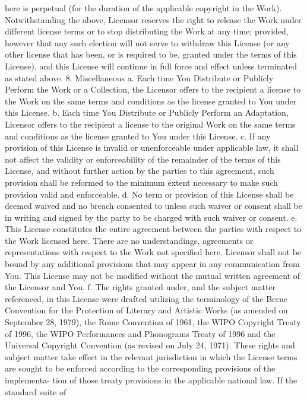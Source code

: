\documentclass[oneside]{book}
\begin{document}
here is perpetual (for the duration of the applicable copyright in the
Work). Notwithstanding the above, Licensor reserves the right to release the
Work under different license terms or to stop distributing the Work at any time;
provided, however that any such election will not serve to withdraw this License
(or any other license that has been, or is required to be, granted under the
terms of this License), and this License will continue in full force and effect
unless terminated as stated above.  8. Miscellaneous a. Each time You Distribute
or Publicly Perform the Work or a Collection, the Licensor offers to the
recipient a license to the Work on the same terms and conditions as the license
granted to You under this License.  b. Each time You Distribute or Publicly
Perform an Adaptation, Licensor offers to the recipient a license to the
original Work on the same terms and conditions as the license granted to You
under this License.  c. If any provision of this License is invalid or
unenforceable under applicable law, it shall not affect the validity or
enforceability of the remainder of the terms of this License, and without
further action by the parties to this agreement, such provision shall be
reformed to the minimum extent necessary to make such provision valid and
enforceable.  d. No term or provision of this License shall be deemed waived and
no breach consented to unless such waiver or consent shall be in writing and
signed by the party to be charged with such waiver or consent.  e. This License
constitutes the entire agreement between the parties with respect to the Work
licensed here. There are no understandings, agreements or representations with
respect to the Work not specified here. Licensor shall not be bound by any
additional provisions that may appear in any communication from You. This
License may not be modified without the mutual written agreement of the Licensor
and You.  f. The rights granted under, and the subject matter referenced, in
this License were drafted utilizing the terminology of the Berne Convention for
the Protection of Literary and Artistic Works (as amended on September 28,
1979), the Rome Convention of 1961, the WIPO Copyright Treaty of 1996, the WIPO
Performances and Phonograms Treaty of 1996 and the Universal Copyright
Convention (as revised on July 24, 1971). These rights and subject matter take
effect in the relevant jurisdiction in which the License terms are sought to be
enforced according to the corresponding provisions of the implementa- tion of
those treaty provisions in the applicable national law. If the standard suite of
\end{document}
